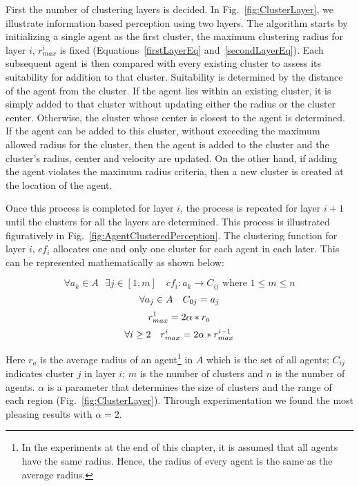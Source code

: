 First the number of clustering layers is decided. In Fig.~\ref{fig:ClusterLayer}, we illustrate information based perception using two layers. The algorithm starts by initializing a single agent as the first cluster, the maximum clustering radius for layer $i$, $r^{i}_{max}$ is fixed (Equations~\ref{firstLayerEq} and~\ref{secondLayerEq}). Each subsequent agent is then compared with every existing cluster to assess its suitability for addition to that cluster. Suitability is determined by the distance of the agent from the cluster. If the agent lies within an existing cluster, it is simply added to that cluster without updating either the radius or the cluster center. Otherwise, the cluster whose center is closest to the agent is determined. If the agent can be added to this cluster, without exceeding the maximum allowed radius for the cluster, then the agent is added to the cluster and the cluster's radius, center and velocity are updated. On the other hand, if adding the agent violates the maximum radius criteria, then a new cluster is created at the location of the agent.

Once this process is completed for layer $i$, the process is repeated for layer $i+1$ until the clusters for all the layers are determined. This process is illustrated figuratively in Fig.~\ref{fig:AgentClusteredPerception}. The clustering function for layer $i$, $cf_{i}$ allocates one and only one cluster for each agent in each later. This can be represented mathematically as shown below:

\begin{equation}
   \forall a_{k} {\in} A \mbox{ }\exists j \in  [1 , m] \quad cf_{i} : a_{k} {\rightarrow} C_{ij} \mbox{ where } 1 {\leq} m {\leq} n
\end{equation}
\begin{equation}
  \\ \forall a_{j} \in A \quad C_{0j} = a_{j}
\end{equation}
\begin{equation}
 \\r^{1}_{max} = 2 \alpha * r_{a}
  \label{firstLayerEq}
\end{equation}
\begin{equation}
  \\ \forall i \geq 2 \quad   r^{i}_{max} = 2 \alpha * r ^{i-1} _{max}
   \label{secondLayerEq}
\end{equation}

Here $r_{a}$ is the average radius of an agent\footnote{In the experiments at the end of this chapter, it is assumed that all agents have the same radius. Hence, the radius of every agent is the same as the average radius.} in $A$ which is the set of all agents; $C_{ij}$ indicates cluster $j$ in layer $i$; $m$ is the number of clusters and $n$ is the number of agents. $\alpha$ is a parameter that determines the size of clusters and the range of each region (Fig.~\ref{fig:ClusterLayer}). Through experimentation we found the most pleasing results with $\alpha = 2$.

